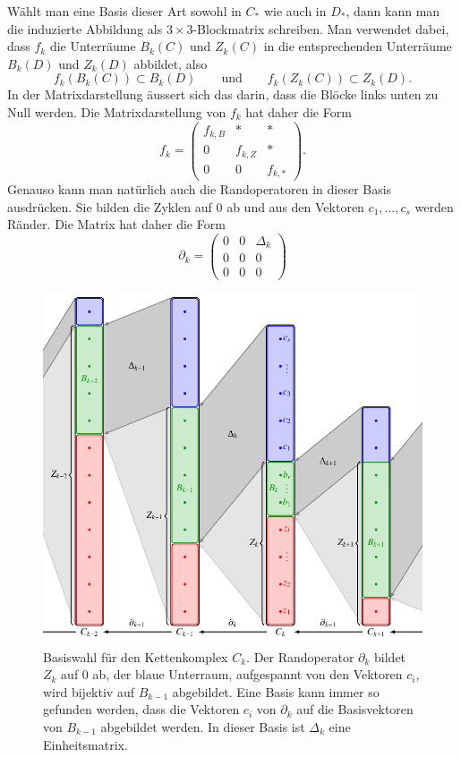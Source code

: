 Wählt man eine Basis dieser Art sowohl in $C_*$ wie auch in $D_*$,
dann kann man die induzierte Abbildung als $3\times 3$-Blockmatrix
schreiben.
Man verwendet dabei, dass $f_k$ die Unterräume $B_k(C)$ und
$Z_k(C)$ in die entsprechenden Unterräume $B_k(D)$ und $Z_k(D)$
abbildet, also
\[
f_k(B_k(C)) \subset B_k(D)
\qquad\text{und}\qquad
f_k(Z_k(C)) \subset Z_k(D).
\]
In der Matrixdarstellung äussert sich das darin, dass die Blöcke
links unten zu Null werden.
Die Matrixdarstellung von $f_k$ hat daher die Form
\[
f_k
=
\begin{pmatrix}
f_{k,B} &    *    & * \\
   0    & f_{k,Z} & * \\
   0    &    0    & f_{k,*}
\end{pmatrix}.
\]
Genauso kann man natürlich auch die Randoperatoren in dieser Basis
ausdrücken.
Sie bilden die Zyklen auf $0$ ab und aus den Vektoren $c_1,\dots,c_s$
werden Ränder.
Die Matrix hat daher die Form
\[
\partial_k
=
\begin{pmatrix}
0& 0 & \Delta_k \\
0& 0 & 0 \\
0& 0 & 0
\end{pmatrix}
\]
\begin{figure}
\centering
\includegraphics{chapters/95-homologie/images/complexbasis.pdf}
\caption{Basiswahl für den Kettenkomplex $C_k$.
Der Randoperator $\partial_k$ bildet $Z_k$ auf $0$ ab, der blaue
Unterraum, aufgespannt von den Vektoren $c_i$, wird bijektiv auf $B_{k-1}$
abgebildet.
Eine Basis kann immer so gefunden werden, dass die Vektoren $c_i$ 
von $\partial_k$ auf die Basisvektoren von $B_{k-1}$ abgebildet werden.
In dieser Basis ist $\Delta_k$ eine Einheitsmatrix.
\label{buch:homologie:fig:komplexbasis}}
\end{figure}%
